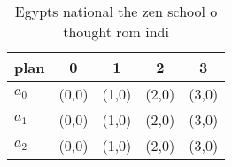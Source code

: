 \documentclass[a4paper]{article}
\begin{document}
\begin{table}
\begin{adjustbox}{width=0.6\columnwidth}
\begin{tabular}{|l|l|l|l|l|}
\hline
\textbf{plan} & \multicolumn{1}{c|}{\textbf{0}} & \multicolumn{1}{c|}{\textbf{1}} & \multicolumn{1}{c|}{\textbf{2}} & \multicolumn{1}{c|}{\textbf{3}} \\ \hline
\textbf{$a_0$}  & (0,0) & (1,0) & (2,0) & (3,0) \\ \hline
\textbf{$a_1$}  & (0,0) & (1,0) & (2,0) & (3,0) \\ \hline
\textbf{$a_2$}  & (0,0) & (1,0) & (2,0) & (3,0) \\ \hline
\end{tabular}
\end{adjustbox}
\caption{Egypts national the zen school o thought rom indi
}
\end{table}
\end{document}
